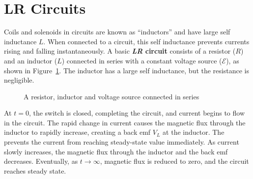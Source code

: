 \section{LR Circuits}
Coils and solenoids in circuits are known as ``inductors'' and have large self
inductance $L$. When connected to a circuit, this self inductance prevents
currents rising and falling instantaneously. A basic \textbf{\emph{LR} circuit}
consists of a resistor ($R$) and an inductor ($L$) connected in series with a
constant voltage source ($\mathcal E$), as shown in Figure~\ref{fig:LR}. The
inductor has a large self inductance, but the resistance is negligible.
\begin{figure}[ht]
  \centering
  \caption{A resistor, inductor and voltage source connected in series}
  \label{fig:LR}
\end{figure}

At $t=0$, the switch is closed, completing the circuit, and current begins to
flow in the circuit. The rapid change in current causes the magnetic flux
through the inductor to rapidly increase, creating a back emf $V_L$ at the
inductor. The prevents the current from reaching steady-state value immediately.
As current slowly increases, the magnetic flux through the inductor and the
back emf decreases. Eventually, as $t\rightarrow\infty$, magnetic flux is
reduced to zero, and the circuit reaches steady state.


